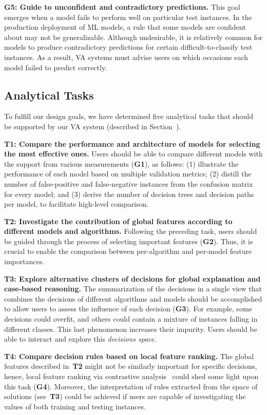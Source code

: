 \textbf{G5: Guide to unconfident and contradictory predictions.} 
This goal emerges when a model fails to perform well on particular test instances. In the production deployment of ML models, a rule that some models are confident about may not be generalizable. Although undesirable, it is relatively common for models to produce contradictory predictions for certain difficult-to-classify test instances. As a result, VA systems must advise users on which occasions each model failed to predict correctly.

\subsection{Analytical Tasks}
To fulfill our design goals, we have determined five analytical tasks that should be supported by our VA system (described in Section~).

\textbf{T1: Compare the performance and architecture of models for selecting the most effective ones.}
Users should be able to compare different models with the support from various measurements (\textbf{G1}), as follows: (1) illustrate the performance of each model based on multiple validation metrics; (2) distill the number of false-positive and false-negative instances from the confusion matrix for every model; and (3) derive the number of decision trees and decision paths per model, to facilitate high-level comparison.

\textbf{T2: Investigate the contribution of global features according to different models and algorithms.}
Following the preceding task, users should be guided through the process of selecting important features  (\textbf{G2}). Thus, it is crucial to enable the comparison between per-algorithm and per-model feature importances.

\textbf{T3: Explore alternative clusters of decisions for global explanation and case-based reasoning.} The summarization of the decisions in a single view that combines the decisions of different algorithms and models should be accomplished to allow users to assess the influence of each decision (\textbf{G3}). For example, some decisions could overfit, and others could contain a mixture of instances falling in different classes. This last phenomenon increases their impurity. Users should be able to interact and explore this \emph{decisions space}.

\textbf{T4: Compare decision rules based on local feature ranking.} The global features described in~\textbf{T2} might not be similarly important for specific decisions, hence, local feature ranking via contrastive analysis~\cite{Zou2013Contrastive} could shed some light upon this task (\textbf{G4}). Moreover, the interpretation of rules extracted from the space of solutions (see~\textbf{T3}) could be achieved if users are capable of investigating the values of both training and testing instances.


